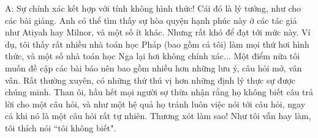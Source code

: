 \begin{multicols}{2}
	\vskip 0.1cm
	A: Sự chính xác kết hợp với tính không hình thức! Cái đó là lý tưởng, như cho các bài giảng. Anh có thể tìm thấy sự hòa quyện hạnh phúc này ở các tác giả như Atiyah hay Milnor, và một số ít khác. Nhưng rất khó để đạt tới mức này. Ví dụ, tôi thấy rất nhiều nhà toán học Pháp (bao gồm cả tôi) làm mọi thứ hơi hình thức, và một số nhà toán học Nga lại hơi không chính xác...
	\vskip 0.1cm
	Một điểm nữa tôi muốn đề cập các bài báo nên bao gồm nhiều hơn những lưu ý, câu hỏi mở, vân vân. Rất thường xuyên, có những thứ thú vị hơn những định lý thực sự được chúng minh. Than ôi, hầu hết mọi người sợ thừa nhận rằng họ không biết câu trả lời cho một câu hỏi, và như một hệ quả họ tránh luôn việc nói tới câu hỏi, ngay cả khi nó là một câu hỏi rất tự nhiên. Thương xót làm sao! Như tôi vẫn hay làm, tôi thích nói ``tôi không biết". 
\end{multicols}